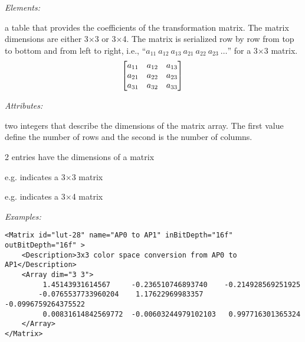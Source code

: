  
\emph{Elements:}
\begin{xmlfields}
    \xmlitem[Array][required] 
    a table that provides the coefficients of the transformation matrix. The matrix dimensions are either 3$\times$3 or 3$\times$4. The matrix is serialized row by row from top to bottom and from left to right, i.e., ``$a_{11}\ a_{12}\ a_{13}\ a_{21}\ a_{22}\ a_{23}\ \ldots$'' for a 3$\times$3 matrix.
        \begin{equation}
            \begin{bmatrix*}
                a_{11} & a_{12} & a_{13} \\
                a_{21} & a_{22} & a_{23} \\
                a_{31} & a_{32} & a_{33} \\
            \end{bmatrix*} \\
        \end{equation}

    \emph{Attributes:}
    \begin{xmlfields}            
        \xmlitem[dim][required] 
        two integers that describe the dimensions of the matrix array. The first value define the number of rows and the second is the number of columns. 
        
        2 entries have the dimensions of a matrix
        \begin{list}{}{\setlength{\itemsep}{4pt}\setlength{\topsep}{0pt}}
                \item e.g.  indicates a 3$\times$3 matrix
                \item e.g.  indicates a 3$\times$4 matrix
        \end{list}
    \end{xmlfields}

    
\end{xmlfields}


\emph{Examples:}
\begin{lstlisting}[caption=Example of a \xml{Matrix} node with \xml{dim="3 3 3"}]
<Matrix id="lut-28" name="AP0 to AP1" inBitDepth="16f" outBitDepth="16f" >
    <Description>3x3 color space conversion from AP0 to AP1</Description>
    <Array dim="3 3">
         1.45143931614567     -0.236510746893740    -0.214928569251925
        -0.0765537733960204    1.17622969983357     -0.0996759264375522
         0.00831614842569772  -0.00603244979102103   0.997716301365324
    </Array>
</Matrix>
\end{lstlisting}

